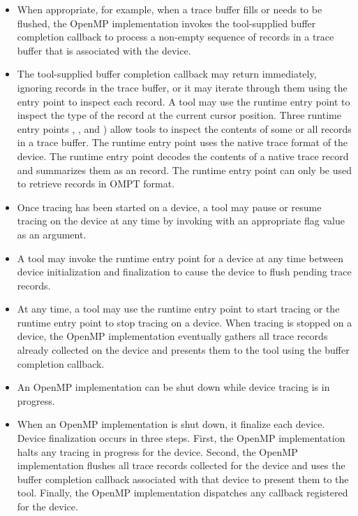 \begin{itemize}
\item When appropriate, for example, when a trace buffer fills or needs to be
      flushed, the OpenMP implementation invokes the tool-supplied buffer
      completion callback to process a non-empty sequence of records in a 
      trace buffer that is associated with the device.
\item The tool-supplied buffer completion callback may return immediately, 
      ignoring records in the trace buffer, or it may iterate through them 
      using the  entry point to inspect 
      each record. A tool may use the  runtime 
      entry point to inspect the type of the record at the current cursor 
      position. Three runtime entry points , 
      , and ) 
      allow tools to inspect the contents of some or all records in a trace 
      buffer. The  runtime entry point uses 
      the native trace format of the device. The  
      runtime entry point decodes the contents of a native trace record and 
      summarizes them as an  record. The 
       runtime entry point can only be used to
      retrieve records in OMPT format.
\item Once tracing has been started on a device, a tool may pause or resume
      tracing on the device at any time by invoking  
      with an appropriate flag value as an argument.
\item A tool may invoke  the  runtime entry point for a
      device at any time between device initialization and finalization to cause 
      the device to flush pending trace records.
\item At any time, a tool may use the  runtime entry point
      to start tracing or the  runtime entry point to stop 
      tracing on a device. When tracing is stopped on a device, the OpenMP 
      implementation eventually gathers all trace records already collected 
      on the device and presents them to the tool using the buffer completion callback.
\item An OpenMP implementation can be shut down while device tracing is in progress.
\item When an OpenMP implementation is shut down, it finalize each device. Device 
      finalization occurs in three steps. First, the OpenMP implementation halts any 
      tracing in progress for the device. Second, the OpenMP implementation flushes 
      all trace records collected for the device and uses the buffer completion 
      callback associated with that device to present them to the tool. Finally, 
      the OpenMP implementation dispatches any  
      callback registered for the device.
\end{itemize}

